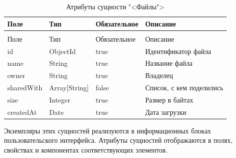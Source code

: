 \begin{xltabular}{\textwidth}{|l|l|p{3.2cm}|X|}
  \caption{Атрибуты сущности "<Файлы">\label{files:table}}\\ \hline
  Поле & Тип & Обязательное & Описание \\ \hline
  \endfirsthead
  \\ \hline
  Поле & Тип & Обязательное & Описание \\ \hline
  \endhead
  id & ObjectId & true & Идентификатор файла \\ \hline
  name & String & true & Название файла \\ \hline
  owner & String & true & Владелец \\ \hline
  sharedWith & Array[String] & false & Список, с кем поделились \\ \hline
  size & Integer & true & Размер в байтах \\ \hline
  createdAt & Date & true & Дата загрузки \\ \hline
\end{xltabular}

Экземпляры этих сущностей реализуются в информационных блоках пользовательского интерфейса. Атрибуты сущностей отображаются в полях, свойствах и компонентах соответствующих элементов.
